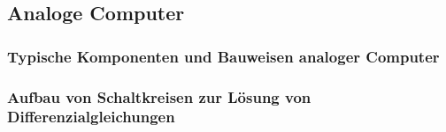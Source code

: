 \subsection{Analoge Computer}



\subsubsection{Typische Komponenten und Bauweisen analoger Computer}

\subsubsection{Aufbau von Schaltkreisen zur Lösung von Differenzialgleichungen}
